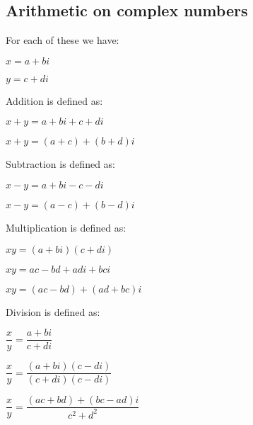 
\subsection{Arithmetic on complex numbers}

For each of these we have:

\(x=a+bi\)

\(y=c+di\)

Addition is defined as:

\(x+y=a+bi+c+di\)

\(x+y=(a+c)+(b+d)i\)

Subtraction is defined as:

\(x-y=a+bi-c-di\)

\(x-y=(a-c)+(b-d)i\)

Multiplication is defined as:

\(xy=(a+bi)(c+di)\)

\(xy=ac-bd+adi+bci\)

\(xy=(ac-bd)+(ad+bc)i\)

Division is defined as:

\(\dfrac{x}{y}=\dfrac{a+bi}{c+di}\)

\(\dfrac{x}{y}=\dfrac{(a+bi)(c-di)}{(c+di)(c-di)}\)

\(\dfrac{x}{y}=\dfrac{(ac+bd)+(bc-ad)i}{c^2+d^2}\)


